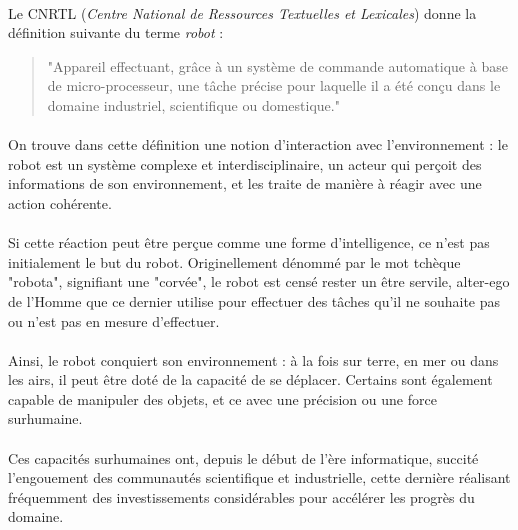 \documentclass[a4paper,10pt]{article}
\begin{document}
        \paragraph{}
            Le CNRTL (\textit{Centre National de Ressources Textuelles et Lexicales}) donne la définition 
            suivante du terme \textit{robot} : 
            
        \begin{quote}
            "Appareil effectuant, grâce à un système de commande automatique à base de micro-processeur,
            une tâche précise pour laquelle il a été conçu dans le domaine industriel, scientifique ou domestique."
        \end{quote}
        
        \paragraph{}
            On trouve dans cette définition une notion d'interaction avec l'environnement : le 
            robot est un système complexe et interdisciplinaire, un acteur qui perçoit des informations 
            de son environnement, et les traite de manière à réagir avec une action cohérente. 
            
        \paragraph{}
            Si cette réaction peut être perçue comme une forme d'intelligence, ce n'est pas initialement 
            le but du robot. Originellement dénommé par le mot tchèque "robota", signifiant une "corvée", 
            le robot est censé rester un être servile, alter-ego de l'Homme que ce dernier utilise pour 
            effectuer des tâches qu'il ne souhaite pas ou n'est pas en mesure d'effectuer. 
            
        \paragraph{}
            Ainsi, le robot conquiert son environnement : à la fois sur terre, en mer ou dans les airs, 
            il peut être doté de la capacité de se déplacer. 
            Certains sont également capable de manipuler des objets, et ce avec une précision ou une force
            surhumaine. 
            
        \paragraph{}
            Ces capacités surhumaines ont, depuis le début de l'ère informatique, succité l'engouement 
            des communautés scientifique et industrielle, cette dernière réalisant fréquemment des investissements 
            considérables pour accélérer les progrès du domaine. 
            
\end{document}
